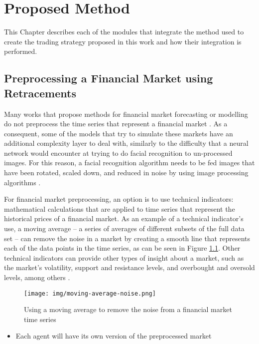 \chapter{Proposed Method}
\label{chapter:proposed-method}

This Chapter describes each of the modules that integrate the method used to
create the trading strategy proposed in this work and how their integration is
performed.

\section{Preprocessing a Financial Market using Retracements}
\label{section:preprocessing-a-financial-market-using-retracements}

Many works that propose methods for financial market forecasting or modelling do
not preprocess the time series that represent a financial market \cite{}. As a
consequent, some of the models that try to simulate these markets have an additional
complexity layer to deal with, similarly to the difficulty that a neural network
would encounter at trying to do facial recognition to un-processed images. For
this reason, a facial recognition algorithm needs to be fed images that have
been rotated, scaled down, and reduced in noise by using image processing
algorithms \cite{}.

For financial market preprocessing, an option is to use technical indicators:
mathematical calculations that are applied to time series that represent the
historical prices of a financial market. As an example of a technical
indicator's use, a moving average -- a series of averages of different subsets
of the full data set -- can remove the noise in a market by creating a smooth
line that represents each of the data points in the time series, as can be seen in Figure
\ref{figure:moving-average-noise}. Other technical indicators can provide other
types of insight about a market, such as the market's volatility, support and
resistance levels, and overbought and oversold levels, among others \cite{}.

\begin{figure}
\caption{Using a moving average to remove the noise from a financial market time
series} \centering
\texttt{[image: img/moving-average-noise.png]}
\label{figure:moving-average-noise}
\end{figure}



\begin{itemize}
\item Each agent will have its own version of the preprocessed market
\end{itemize}

